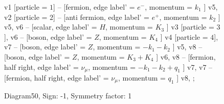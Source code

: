 \documentclass{revtex4}
\begin{document}
\begin{figure}[!htb]
\begin{center}
{    %
v1 [particle = \(1\)] -- [fermion, edge label' = \(e^{-}\), momentum = \(k_{1}\) ] v5, 
v2 [particle = \(2\)] -- [anti fermion, edge label' = \(e^{+}\), momentum = \(k_{2}\) ] v5, 
v6 -- [scalar, edge label' = \(H\), momentum = \(K_{3}\) ] v3 [particle = \(3\)], 
v6 -- [boson, edge label' = \(Z\), momentum = \(K_{4}\) ] v4 [particle = \(4\)], 
v7 -- [boson, edge label' = \(Z\), momentum = \(-k_{1} - k_{2}\) ] v5, 
v8 -- [boson, edge label' = \(Z\), momentum = \(K_{3} + K_{4}\) ] v6, 
v8 -- [fermion, half right, edge label' = \(\nu_{\mu}\), momentum = \(-k_{1} - k_{2} + q_{1}\) ] v7, 
v7 -- [fermion, half right, edge label' = \(\nu_{\mu}\), momentum = \(q_{1}\) ] v8, 
};
\end{center}
\caption{Diagram50, Sign: -1, Symmetry factor: 1}
\end{figure}
\newpage
\end{document}

